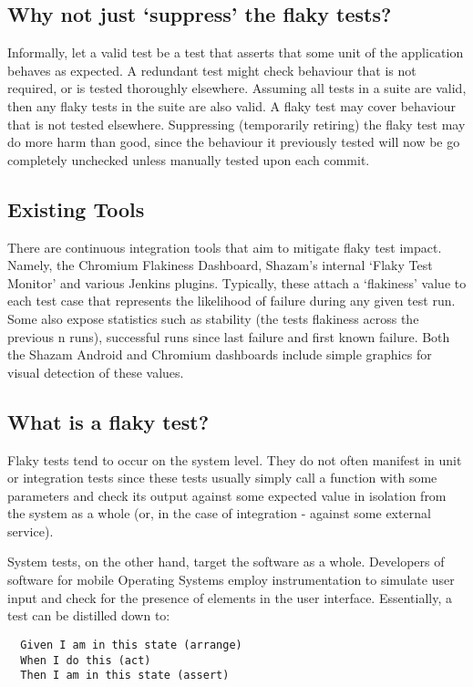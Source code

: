 \subsection{Why not just ‘suppress’ the flaky tests?}

Informally, let a valid test be a test that asserts that some unit of the application behaves as expected. A redundant test might check behaviour that is not required, or is tested thoroughly elsewhere. Assuming all tests in a suite are valid, then any flaky tests in the suite are also valid. A flaky test may cover behaviour that is not tested elsewhere. Suppressing (temporarily retiring) the flaky test may do more harm than good, since the behaviour it previously tested will now be go completely unchecked unless manually tested upon each commit.

\subsection{Existing Tools}

There are continuous integration tools that aim to mitigate flaky test impact. Namely, the Chromium Flakiness Dashboard, Shazam’s internal ‘Flaky Test Monitor’ and various Jenkins plugins. Typically, these attach a ‘flakiness’ value to each test case that represents the likelihood of failure during any given test run. Some also expose statistics such as stability (the tests flakiness across the previous n runs), successful runs since last failure and first known failure. Both the Shazam Android and Chromium dashboards include simple graphics for visual detection of these values.

\subsection{What is a flaky test?}
Flaky tests tend to occur on the system level. They do not often manifest in unit or integration tests since these tests usually simply call a function with some parameters and check its output against some expected value in isolation from the system as a whole (or, in the case of integration - against some external service).

System tests, on the other hand, target the software as a whole. Developers of software for mobile Operating Systems employ instrumentation to simulate user input and check for the presence of elements in the user interface. Essentially, a test can be distilled down to:
\begin{verbatim}
  Given I am in this state (arrange)
  When I do this (act)
  Then I am in this state (assert)
\end{verbatim}

